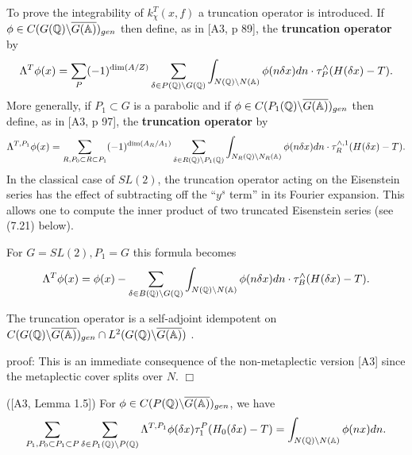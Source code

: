 To prove the integrability of $k_\chi ^T(x,f)$ a truncation operator is
introduced.
If $\phi \in C(G(\mathbb{Q} )\backslash \overline{G(\mathbb{A} )})_{gen}$
then define,
as in [A3, p 89], the \textbf{truncation operator} by 
\begin{equation}
\Lambda ^T\phi (x)
=\sum_P(-1)^{\dim (A/Z)}
\sum_{\delta \in P(\mathbb{Q} )\backslash G(\mathbb{Q} )}
\int_{N(\mathbb{Q} )\backslash N(\mathbb{A} )}\phi (n\delta
x)dn\cdot \tau _P^{\wedge }(H(\delta x)-T).
\end{equation}
More generally, if $P_1\subset G$ is a parabolic and if
$\phi \in C(P_1(\mathbb{Q} )\backslash \overline{G(\mathbb{A} )})_{gen}$ then
define, as in [A3, p 97], the \textbf{truncation operator} by 
\begin{equation}
\Lambda ^{T,P_1}\phi (x)
=\sum_{R , P_0\subset R\subset P_1}
(-1)^{\dim (A_R/A_1)}
\sum_{\delta \in R(\mathbb{Q} )\backslash P_1(\mathbb{Q} )}
\int_{N_R(\mathbb{Q} )\backslash N_R(\mathbb{A} )}
\phi (n\delta x)dn\cdot \tau_R^{\wedge ,1}(H(\delta x)-T).
\end{equation}
In the classical case of $SL(2)$, the truncation operator acting
on the Eisenstein series has the effect of subtracting
off the ``$y^s$ term'' in its Fourier expansion. This allows one 
to compute the inner product of two truncated Eisenstein series
(see (7.21) below).

\begin{example}
For $G=SL(2),P_1=G$ this formula becomes 
\begin{equation}
\Lambda ^T\phi (x)=\phi (x)-\sum_{\delta \in B(\qqq )\backslash G(\qqq %
)}\int_{N(\qqq )\backslash N(\aaa )}\phi (n\delta x)dn\cdot \tau
_B^{\wedge }(H(\delta x)-T).
\end{equation}
\end{example}

\begin{lemma}
The truncation operator is a self-adjoint idempotent on
$C(G(\mathbb{Q} )\backslash \overline{G(\mathbb{A} )})_{gen}
\cap L^2(G(\mathbb{Q} )\backslash \overline{G(\mathbb{A} )})$ .
\end{lemma}
proof: This is an immediate consequence of the non-metaplectic
version [A3] since the metaplectic cover splits over $N$. $\Box$

\begin{lemma}
([A3, Lemma 1.5]) For
$\phi \in C(P(\mathbb{Q} )\backslash \overline{G(\mathbb{A} )})_{gen}$, we
have 
\[
\sum_{ P_1 , P_0\subset P_1\subset P }
\sum_{\delta \in P_1(\mathbb{Q} )\backslash P(\mathbb{Q} )}
\Lambda ^{T,P_1}\phi (\delta x)\tau _1^P(H_0(\delta x)-T)
=\int_{N(\mathbb{Q} )\backslash N(\mathbb{A} )}\phi (nx)dn.
\]
\end{lemma}

